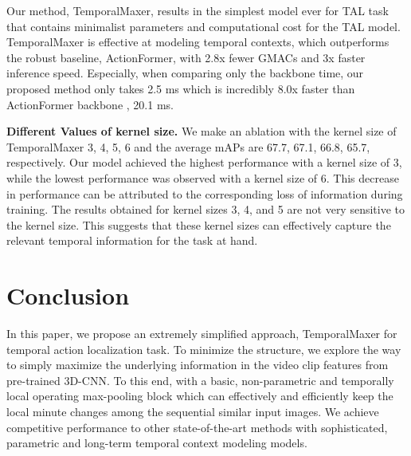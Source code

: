 \documentclass[10pt,twocolumn,letterpaper]{article}
\begin{document}
Our method, TemporalMaxer, results in the simplest model ever for TAL task that contains minimalist parameters and computational cost for the TAL model. TemporalMaxer is effective at modeling temporal contexts, which outperforms the robust baseline, ActionFormer, with 2.8x fewer GMACs and 3x faster inference speed. Especially, when comparing only the backbone time, our proposed method only takes 2.5 ms which is incredibly 8.0x faster than ActionFormer backbone \cite{zhao2021actionness}, 20.1 ms. 

\textbf{Different Values of kernel size.}
We make an ablation with the kernel size of TemporalMaxer 3, 4, 5, 6 and the average mAPs are 67.7, 67.1, 66.8, 65.7, respectively. Our model achieved the highest performance with a kernel size of 3, while the lowest performance was observed with a kernel size of 6. This decrease in performance can be attributed to the corresponding loss of information during training.
The results obtained for kernel sizes 3, 4, and 5 are not very sensitive to the kernel size. This suggests that these kernel sizes can effectively capture the relevant temporal information for the task at hand.




%
  \section{Conclusion}
In this paper, we propose an extremely simplified approach, TemporalMaxer for temporal action localization task. To minimize the structure, we explore the way to simply maximize the underlying information in the video clip features from pre-trained 3D-CNN. To this end, with a basic, non-parametric and temporally local operating max-pooling block which can effectively and efficiently keep the local minute changes among the sequential similar input images.
We achieve competitive performance to other state-of-the-art methods with sophisticated, parametric and long-term temporal context modeling models. 



%
 






{\small


}
\end{document}
